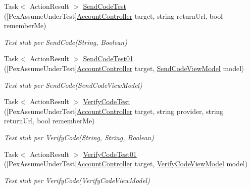 \begin{DoxyCompactItemize}
Task$<$ Action\+Result $>$ \mbox{\hyperlink{class_brew_day2_1_1_controllers_1_1_tests_1_1_account_controller_test_acad5b363b80ec10bd0cef4df916a8a05}{Send\+Code\+Test}} (\mbox{[}Pex\+Assume\+Under\+Test\mbox{]}\mbox{\hyperlink{class_brew_day2_1_1_controllers_1_1_account_controller}{Account\+Controller}} target, string return\+Url, bool remember\+Me)
\begin{DoxyCompactList}\small\item\em Test stub per Send\+Code(\+String, Boolean)\end{DoxyCompactList}\item 
Task$<$ Action\+Result $>$ \mbox{\hyperlink{class_brew_day2_1_1_controllers_1_1_tests_1_1_account_controller_test_aa1a3fc0d69d71b863aad498b632a474d}{Send\+Code\+Test01}} (\mbox{[}Pex\+Assume\+Under\+Test\mbox{]}\mbox{\hyperlink{class_brew_day2_1_1_controllers_1_1_account_controller}{Account\+Controller}} target, \mbox{\hyperlink{class_brew_day2_1_1_models_1_1_send_code_view_model}{Send\+Code\+View\+Model}} model)
\begin{DoxyCompactList}\small\item\em Test stub per Send\+Code(\+Send\+Code\+View\+Model)\end{DoxyCompactList}\item 
Task$<$ Action\+Result $>$ \mbox{\hyperlink{class_brew_day2_1_1_controllers_1_1_tests_1_1_account_controller_test_a67bfb81d948fb0d2058813963c9022ef}{Verify\+Code\+Test}} (\mbox{[}Pex\+Assume\+Under\+Test\mbox{]}\mbox{\hyperlink{class_brew_day2_1_1_controllers_1_1_account_controller}{Account\+Controller}} target, string provider, string return\+Url, bool remember\+Me)
\begin{DoxyCompactList}\small\item\em Test stub per Verify\+Code(\+String, String, Boolean)\end{DoxyCompactList}\item 
Task$<$ Action\+Result $>$ \mbox{\hyperlink{class_brew_day2_1_1_controllers_1_1_tests_1_1_account_controller_test_a5240f395e923273ea45c050981c8c029}{Verify\+Code\+Test01}} (\mbox{[}Pex\+Assume\+Under\+Test\mbox{]}\mbox{\hyperlink{class_brew_day2_1_1_controllers_1_1_account_controller}{Account\+Controller}} target, \mbox{\hyperlink{class_brew_day2_1_1_models_1_1_verify_code_view_model}{Verify\+Code\+View\+Model}} model)
\begin{DoxyCompactList}\small\item\em Test stub per Verify\+Code(\+Verify\+Code\+View\+Model)\end{DoxyCompactList}\item 

\end{DoxyCompactItemize}
